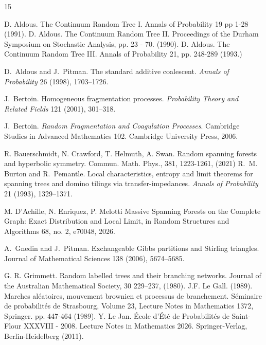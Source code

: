 \documentclass[11pt]{article}
\begin{document}

\begin{thebibliography}{15}


 D. Aldous. The Continuum Random Tree I. Annals of Probability 19 pp 1-28 (1991).
 D. Aldous. The Continuum Random Tree II.  Proceedings of the Durham Symposium on Stochastic Analysis, pp. 23 - 70. (1990).
 D. Aldous. The Continuum Random Tree III. Annals of Probability 21, pp. 248-289 (1993.)


D.~Aldous and J.~Pitman.
The standard additive coalescent.
\emph{Annals of Probability} 26 (1998), 1703--1726.

J.~Bertoin.
Homogeneous fragmentation processes.
\emph{Probability Theory and Related Fields} 121 (2001), 301--318.

J.~Bertoin.
\emph{Random Fragmentation and Coagulation Processes}.
Cambridge Studies in Advanced Mathematics 102.
Cambridge University Press, 2006.


 R. Bauerschmidt, N. Crawford, T. Helmuth, A. Swan.  Random spanning forests and hyperbolic symmetry. Commun. Math. Phys., 381, 1223-1261, (2021)
R.~M. Burton and R.~Pemantle.
Local characteristics, entropy and limit theorems for spanning trees
and domino tilings via transfer-impedances.
\emph{Annals of Probability} 21 (1993), 1329--1371.

 M. D'Achille, N. Enriquez, P. Melotti Massive Spanning Forests on the Complete Graph: Exact Distribution and Local Limit, in Random Structures and Algorithms 68, no. 2, e70048, 2026.


A.~Gnedin and J.~Pitman.
Exchangeable Gibbs partitions and Stirling triangles.
Journal of Mathematical Sciences 138 (2006), 5674--5685.


 G. R. Grimmett. Random labelled trees and their branching networks. Journal of the Australian Mathematical Society, 30 229–237, (1980).
 J.F. Le Gall. (1989). Marches aléatoires, mouvement brownien et processus de branchement. Séminaire de probabilités de Strasbourg, Volume 23, Lecture Notes in Mathematics 1372, Springer. pp. 447-464 (1989).
 Y. Le Jan.    \'{E}cole d'\'{E}t\'{e} de Probabilit\'{e}s de Saint-Flour XXXVIII - 2008. Lecture Notes in Mathematics 2026. 
Springer-Verlag, Berlin-Heidelberg (2011).
 

\end{thebibliography}
\end{document}
